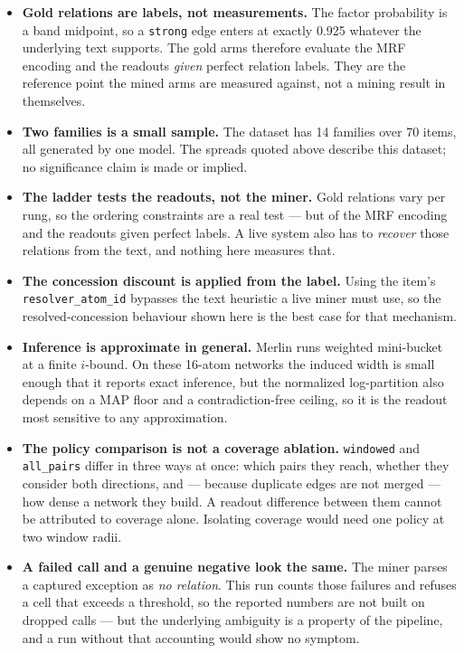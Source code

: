 \documentclass[11pt]{article}
\begin{document}
\begin{itemize}
\item \textbf{Gold relations are labels, not measurements.} The factor probability is a band midpoint, so a \texttt{strong} edge enters at exactly 0.925 whatever the underlying text supports. The gold arms therefore evaluate the MRF encoding and the readouts \emph{given} perfect relation labels. They are the reference point the mined arms are measured against, not a mining result in themselves.
\item \textbf{Two families is a small sample.} The dataset has 14 families over 70 items, all generated by one model. The spreads quoted above describe this dataset; no significance claim is made or implied.
\item \textbf{The ladder tests the readouts, not the miner.} Gold relations vary per rung, so the ordering constraints are a real test --- but of the MRF encoding and the readouts given perfect labels. A live system also has to \emph{recover} those relations from the text, and nothing here measures that.
\item \textbf{The concession discount is applied from the label.} Using the item's \texttt{resolver\_atom\_id} bypasses the text heuristic a live miner must use, so the resolved-concession behaviour shown here is the best case for that mechanism.
\item \textbf{Inference is approximate in general.} Merlin runs weighted mini-bucket at a finite $i$-bound. On these 16-atom networks the induced width is small enough that it reports exact inference, but the normalized log-partition also depends on a MAP floor and a contradiction-free ceiling, so it is the readout most sensitive to any approximation.
\item \textbf{The policy comparison is not a coverage ablation.} \texttt{windowed} and \texttt{all\_pairs} differ in three ways at once: which pairs they reach, whether they consider both directions, and --- because duplicate edges are not merged --- how dense a network they build. A readout difference between them cannot be attributed to coverage alone. Isolating coverage would need one policy at two window radii.
\item \textbf{A failed call and a genuine negative look the same.} The miner parses a captured exception as \emph{no relation}. This run counts those failures and refuses a cell that exceeds a threshold, so the reported numbers are not built on dropped calls --- but the underlying ambiguity is a property of the pipeline, and a run without that accounting would show no symptom.

\end{itemize}
\end{document}
